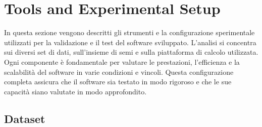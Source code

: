 \section{Tools and Experimental Setup}
\label{sec:experimental-setup}

In questa sezione vengono descritti gli strumenti e la configurazione sperimentale utilizzati per la validazione e il test del software sviluppato. L'analisi si concentra sui diversi set di dati, sull'insieme di semi e sulla piattaforma di calcolo utilizzata. Ogni componente è fondamentale per valutare le prestazioni, l'efficienza e la scalabilità del software in varie condizioni e vincoli. Questa configurazione completa assicura che il software sia testato in modo rigoroso e che le sue capacità siano valutate in modo approfondito.




	\subsection{Dataset}
	\label{subsec:dataset}
	
